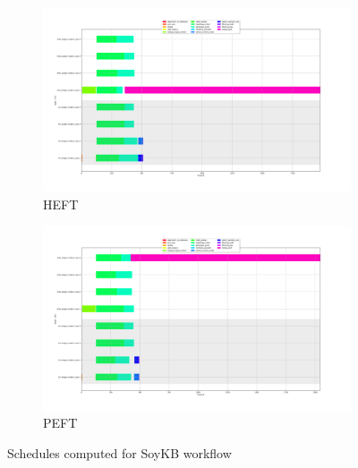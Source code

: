 \begin{figure}[H]
\begin{subfigure}{1.0\textwidth}
\centering
\includegraphics[width=1\linewidth]{figures/5-2-soykb_heft.png}
\caption[Schedules computed for SoyKB workflow - HEFT]{HEFT}
\label{fig:setup-input:soykb:heft}
\end{subfigure}
\begin{subfigure}{1.0\textwidth}
\centering
\includegraphics[width=1\linewidth]{figures/5-2-soykb_peft.png}
\caption[Schedules computed for SoyKB workflow - PEFT]{PEFT}
\label{fig:setup-input:soykb:peft}
\end{subfigure}
\centering
\caption[Schedules computed for SoyKB workflow]{Schedules computed for SoyKB workflow}
\label{fig:setup-input:soykb}
\end{figure}

